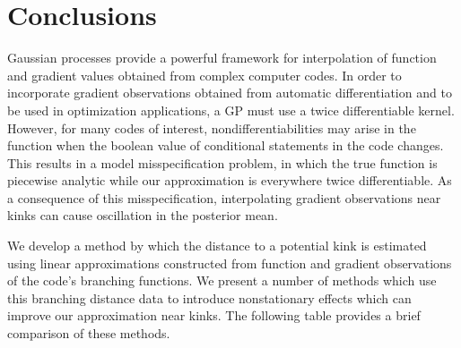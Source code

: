 \documentclass{article}
\numberwithin{equation}{section}
\begin{document}
\section{Conclusions}
Gaussian processes provide a powerful framework for interpolation of function and gradient values obtained from complex computer codes. In order to incorporate gradient observations obtained from automatic differentiation and to be used in optimization applications, a GP must use a twice differentiable kernel. However, for many codes of interest, nondifferentiabilities may arise in the function when the boolean value of conditional statements in the code changes. This results in a model misspecification problem, in which the true function is piecewise analytic while our approximation is everywhere twice differentiable. As a consequence of this misspecification, interpolating gradient observations near kinks can cause oscillation in the posterior mean.

We develop a method by which the distance to a potential kink is estimated using linear approximations constructed from function and gradient observations of the code's branching functions. We present a number of methods which use this branching distance data to introduce nonstationary effects which can improve our approximation near kinks. The following table provides a brief comparison of these methods.
\end{document}
